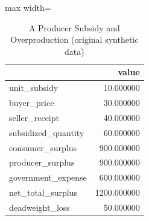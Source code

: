 \begin{table}[htbp]
\centering
\caption{A Producer Subsidy and Overproduction (original synthetic data)}
\begingroup
\small
\setlength{\tabcolsep}{6pt}
\renewcommand{\arraystretch}{1.12}
\begin{adjustbox}{max width=\linewidth}
\begin{tabular}{@{}lr@{}}
\toprule
 & value \\
\midrule
unit\_subsidy & 10.000000 \\
buyer\_price & 30.000000 \\
seller\_receipt & 40.000000 \\
subsidized\_quantity & 60.000000 \\
consumer\_surplus & 900.000000 \\
producer\_surplus & 900.000000 \\
government\_expense & 600.000000 \\
net\_total\_surplus & 1200.000000 \\
deadweight\_loss & 50.000000 \\
\bottomrule
\end{tabular}
\end{adjustbox}
\endgroup
\end{table}
